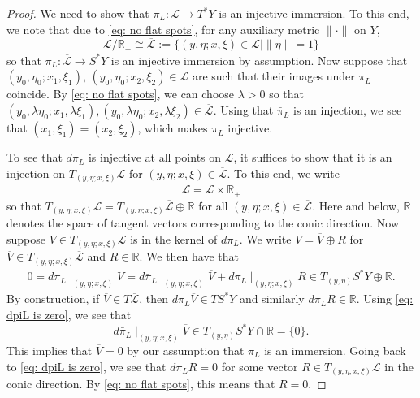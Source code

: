 \documentclass[11pt]{amsart}
\theoremstyle{definition}
\numberwithin{equation}{section}
\begin{document}
\begin{proof}
We need to show that $\pi_L : \mathcal L \to T^*Y$ is an injective immersion. To this end, we note that due to \eqref{eq: no flat spots}, for any auxiliary metric $\|\cdot\|$ on $Y$,
$$\mathcal L/\mathbb R_+ \cong \overline{\mathcal L} := \{(y,\eta; x,\xi)\in \mathcal L \mid \|\eta\| = 1\}$$
so that $\bar \pi_L :  \overline{\mathcal L} \to S^*Y$ 
is an injective immersion by assumption. Now suppose that $(y_0,\eta_0; x_1,\xi_1)$, $(y_0,\eta_0; x_2,\xi_2)\in \mathcal L$ are such that their images under $\pi_L$ coincide. By \eqref{eq: no flat spots}, we can choose $\lambda>0$ so that $(y_0,\lambda\eta_0; x_1,\lambda\xi_1), (y_0,\lambda\eta_0; x_2,\lambda\xi_2) \in \overline{\mathcal L} $. Using that $\bar\pi_L$ is an injection, we see that $(x_1,\xi_1) = (x_2,\xi_2)$, which makes $\pi_L$ injective. 

To see that $d\pi_L$ is injective at all points on $\mathcal L$, it suffices to show that it is an injection on $T_{(y,\eta; x,\xi)}\mathcal L$
for $(y,\eta; x,\xi)\in\overline{\mathcal L}$. To this end, we write
$$ \mathcal L =  \overline{\mathcal L} \times \mathbb R_+$$
so that $T_{(y,\eta; x,\xi)}\mathcal L = T_{(y,\eta; x,\xi)}\overline{\mathcal L} \oplus \mathbb R$ for all $(y,\eta; x,\xi) \in \overline{\mathcal L}$. Here and below, $\mathbb R$ denotes the space of tangent vectors corresponding to the conic direction. Now suppose $V \in T_{(y,\eta; x,\xi)}\mathcal L$ is in the kernel of $d\pi_L$. We write $V = \overline V \oplus R$ for $\overline V \in T_{(y,\eta; x, \xi)}\overline{\mathcal L}$ and $R\in \mathbb R$. We then have that 
\begin{eqnarray}
\label{eq: dpiL is zero}
0 = d\pi_L\mid_{(y,\eta; x,\xi)} V = d\bar \pi_L\mid_{(y,\eta; x,\xi)} \overline{V} + d\pi_L\mid_{(y,\eta; x,\xi)} R \in T_{(y,\eta)} S^*Y \oplus \mathbb R.
\end{eqnarray}
By construction, if $\overline V \in T \overline{\mathcal L}$, then $d\pi_L \overline V \in TS^*Y$ and similarly $d\pi_L R \in \mathbb R$. Using \eqref{eq: dpiL is zero}, we see that  
\[
d\bar \pi_L\mid_{(y,\eta; x,\xi)} \overline{V} \in T_{(y,\eta)} S^*Y \cap \mathbb R  =\{0\}.
\]
This implies that $\overline V = 0$ by our assumption that $\bar\pi_L$ is an immersion. Going back to \eqref{eq: dpiL is zero}, we see that $d\pi_L R = 0$ for some vector $R\in T_{(y,\eta; x, \xi)} \mathcal L$ in the conic direction. By \eqref{eq: no flat spots}, this means that $R = 0$. \end{proof}
\end{document}
